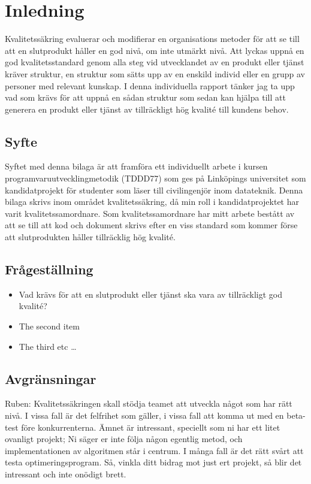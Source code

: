 \section{Inledning}
Kvalitetssäkring evaluerar och modifierar en organisations metoder för att se till att en slutprodukt håller en god nivå, om inte utmärkt nivå.
\newline
\newline
Att lyckas uppnå en god kvalitetsstandard genom alla steg vid utvecklandet av en produkt eller tjänst kräver struktur, en struktur som sätts upp av en enskild individ eller en grupp av personer med relevant kunskap. I denna individuella rapport tänker jag ta upp vad som krävs för att uppnå en sådan struktur som sedan kan hjälpa till att generera en produkt eller tjänst av tillräckligt hög kvalité till kundens behov.

\subsection{Syfte}
Syftet med denna bilaga är att framföra ett individuellt arbete i kursen programvaruutvecklingmetodik (TDDD77) som ges på Linköpings universitet som kandidatprojekt för studenter som läser till civilingenjör inom datateknik. 
\newline
\newline
Denna bilaga skrivs inom området kvalitetssäkring, då min roll i kandidatprojektet har varit kvalitetssamordnare. Som kvalitetssamordnare har mitt arbete bestått av att se till att kod och dokument skrivs efter en viss standard som kommer förse att slutprodukten håller tillräcklig hög kvalité.

\subsection{Frågeställning}

\begin{itemize}
  \item Vad krävs för att en slutprodukt eller tjänst ska vara av tillräckligt god kvalité?
  \item The second item
  \item The third etc \ldots
\end{itemize}

\subsection{Avgränsningar}

Ruben: Kvalitetssäkringen skall stödja teamet att utveckla något som har rätt nivå. I vissa fall är det
felfrihet som gäller, i vissa fall att komma ut med en beta-test före konkurrenterna. Ämnet är intressant, 
speciellt som ni har ett litet ovanligt projekt; Ni säger er inte följa någon egentlig metod, och 
implementationen av algoritmen står i centrum. I många fall är det rätt svårt att testa optimeringsprogram. Så, vinkla ditt bidrag mot just ert projekt, så blir det intressant och inte onödigt 
brett.
